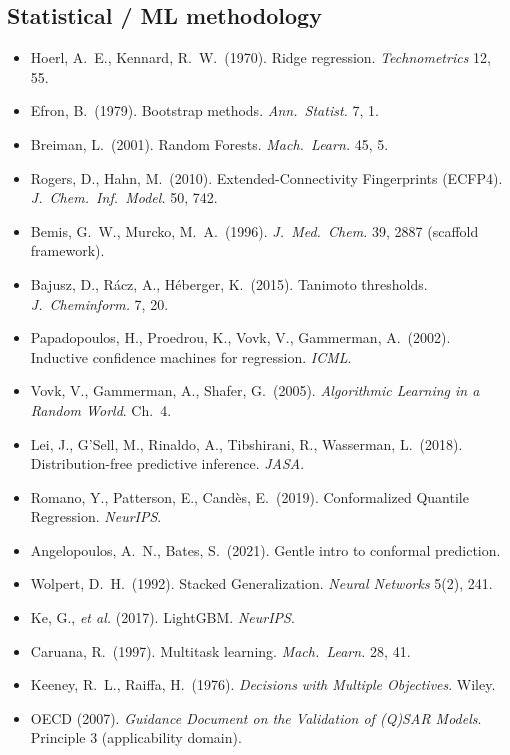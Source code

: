 \documentclass[10pt,a4paper]{article}
\begin{document}
\subsection*{Statistical / ML methodology}
\begin{itemize}\footnotesize
\item Hoerl, A.\ E., Kennard, R.\ W.\ (1970). Ridge regression. \emph{Technometrics} 12, 55.
\item Efron, B.\ (1979). Bootstrap methods. \emph{Ann.\ Statist.} 7, 1.
\item Breiman, L.\ (2001). Random Forests. \emph{Mach.\ Learn.} 45, 5.
\item Rogers, D., Hahn, M.\ (2010). Extended-Connectivity Fingerprints (ECFP4). \emph{J.\ Chem.\ Inf.\ Model.} 50, 742.
\item Bemis, G.\ W., Murcko, M.\ A.\ (1996). \emph{J.\ Med.\ Chem.} 39, 2887 (scaffold framework).
\item Bajusz, D., R\'acz, A., H\'eberger, K.\ (2015). Tanimoto thresholds. \emph{J.\ Cheminform.} 7, 20.
\item Papadopoulos, H., Proedrou, K., Vovk, V., Gammerman, A.\ (2002). Inductive confidence machines for regression. \emph{ICML}.
\item Vovk, V., Gammerman, A., Shafer, G.\ (2005). \emph{Algorithmic Learning in a Random World}. Ch.~4.
\item Lei, J., G'Sell, M., Rinaldo, A., Tibshirani, R., Wasserman, L.\ (2018). Distribution-free predictive inference. \emph{JASA}.
\item Romano, Y., Patterson, E., Cand\`es, E.\ (2019). Conformalized Quantile Regression. \emph{NeurIPS}.
\item Angelopoulos, A.\ N., Bates, S.\ (2021). Gentle intro to conformal prediction.
\item Wolpert, D.\ H.\ (1992). Stacked Generalization. \emph{Neural Networks} 5(2), 241.
\item Ke, G., \textit{et al.} (2017). LightGBM. \emph{NeurIPS}.
\item Caruana, R.\ (1997). Multitask learning. \emph{Mach.\ Learn.} 28, 41.
\item Keeney, R.\ L., Raiffa, H.\ (1976). \emph{Decisions with Multiple Objectives}. Wiley.
\item OECD (2007). \emph{Guidance Document on the Validation of (Q)SAR Models}. Principle 3 (applicability domain).
\end{itemize}
\end{document}
